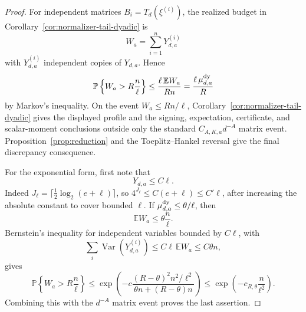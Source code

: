 \documentclass[11pt]{amsart}
\numberwithin{equation}{section}
\theoremstyle{definition}
\theoremstyle{remark}
\newcommand{\Prob}{\mathbb P}
\newcommand{\Exp}{\mathbb E}
\begin{document}
\begin{proof}
For independent matrices \(B_i=T_d(\xi^{(i)})\), the realized budget in
Corollary~\ref{cor:normalizer-tail-dyadic} is
\[
  W_a=\sum_{i=1}^n Y_{d,a}^{(i)}
\]
with \(Y_{d,a}^{(i)}\) independent copies of \(Y_{d,a}\).  Hence
\[
  \Prob\left\{W_a>R\frac n\ell\right\}
  \le \frac{\ell\,\Exp W_a}{Rn}
  =\frac{\ell\,\mu_{d,a}^{\rm dy}}{R}
\]
by Markov's inequality.  On the event \(W_a\le Rn/\ell\),
Corollary~\ref{cor:normalizer-tail-dyadic} gives the displayed profile and the
signing, expectation, certificate, and scalar-moment conclusions outside only
the standard \(C_{A,K,a}d^{-A}\) matrix event.  Proposition~\ref{prop:reduction}
and the Toeplitz--Hankel reversal give the final discrepancy consequence.

For the exponential form, first note that
\[
  Y_{d,a}\le C\ell .
\]
Indeed \(J_\ell=\lceil\frac12\log_2(e+\ell)\rceil\), so
\(4^{J_\ell}\le C(e+\ell)\le C'\ell\), after increasing the absolute constant
to cover bounded \(\ell\).  If \(\mu_{d,a}^{\rm dy}\le\theta/\ell\), then
\[
  \Exp W_a\le \theta\frac n\ell .
\]
Bernstein's inequality for independent variables bounded by \(C\ell\), with
\[
  \sum_i\operatorname{Var}(Y_{d,a}^{(i)})
  \le C\ell\,\Exp W_a\le C\theta n,
\]
gives
\[
  \Prob\left\{W_a>R\frac n\ell\right\}
  \le
  \exp\left(
  -c\frac{(R-\theta)^2n^2/\ell^2}
          {\theta n+(R-\theta)n}
  \right)
  \le
  \exp\left(-c_{R,\theta}\frac n{\ell^2}\right).
\]
Combining this with the \(d^{-A}\) matrix event proves the last assertion.
\end{proof}
\end{document}
